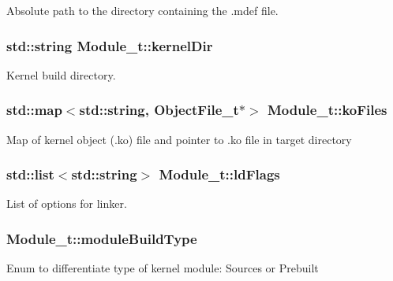 Absolute path to the directory containing the .mdef file. 

\subsubsection[{\texorpdfstring{kernel\+Dir}{kernelDir}}]{\setlength{\rightskip}{0pt plus 5cm}std\+::string Module\+\_\+t\+::kernel\+Dir}\hypertarget{struct_module__t_ac3d6729a9fe952e0aea50be738ac9139}{}\label{struct_module__t_ac3d6729a9fe952e0aea50be738ac9139}


Kernel build directory. 

\subsubsection[{\texorpdfstring{ko\+Files}{koFiles}}]{\setlength{\rightskip}{0pt plus 5cm}std\+::map$<$std\+::string, {\bf Object\+File\+\_\+t}$\ast$$>$ Module\+\_\+t\+::ko\+Files}\hypertarget{struct_module__t_a58c707fff7b462ec48d6489abb838625}{}\label{struct_module__t_a58c707fff7b462ec48d6489abb838625}
Map of kernel object (.ko) file and pointer to .ko file in target directory 
\subsubsection[{\texorpdfstring{ld\+Flags}{ldFlags}}]{\setlength{\rightskip}{0pt plus 5cm}std\+::list$<$std\+::string$>$ Module\+\_\+t\+::ld\+Flags}\hypertarget{struct_module__t_a3a252c5a12ba80aeb9036efb0672a3dd}{}\label{struct_module__t_a3a252c5a12ba80aeb9036efb0672a3dd}


List of options for linker. 

\subsubsection[{\texorpdfstring{module\+Build\+Type}{moduleBuildType}}]{ Module\+\_\+t\+::module\+Build\+Type}\hypertarget{struct_module__t_a95164d9c875ec5ccb299b8efba2fee2d}{}\label{struct_module__t_a95164d9c875ec5ccb299b8efba2fee2d}
Enum to differentiate type of kernel module\+: Sources or Prebuilt 
